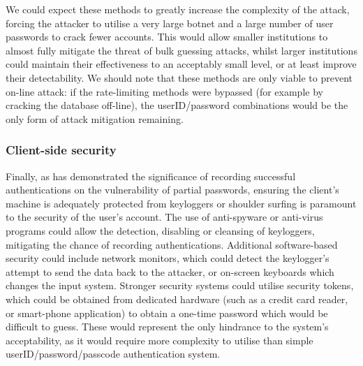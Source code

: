 \documentclass[british,11pt,a4paper]{article}
\begin{document}
We could expect these methods to greatly increase the complexity of the attack, forcing the attacker to utilise a very large botnet and a large number of user passwords to crack fewer accounts. This would allow smaller institutions to almost fully mitigate the threat of bulk guessing attacks, whilst larger institutions could maintain their effectiveness to an acceptably small level, or at least improve their detectability. We should note that these methods are only viable to prevent on-line attack: if the rate-limiting methods were bypassed (for example by cracking the database off-line), the userID/password combinations would be the only form of attack mitigation remaining.

\subsubsection{Client-side security}
Finally, as \citet{Aspinall2013-sh} has demonstrated the significance of recording successful authentications on the vulnerability of partial passwords, ensuring the client's machine is adequately protected from keyloggers or shoulder surfing is paramount to the security of the user's account. The use of anti-spyware or anti-virus programs could allow the detection, disabling or cleansing of keyloggers, mitigating the chance of recording authentications. Additional software-based security could include network monitors, which could detect the keylogger's attempt to send the data back to the attacker, or on-screen keyboards which changes the input system. Stronger security systems could utilise security tokens, which could be obtained from dedicated hardware (such as a credit card reader, or smart-phone application) to obtain a one-time password which would be difficult to guess. These would represent the only hindrance to the system's acceptability, as it would require more complexity to utilise than simple userID/password/passcode authentication system. 

\clearpage


\clearpage
\end{document}
